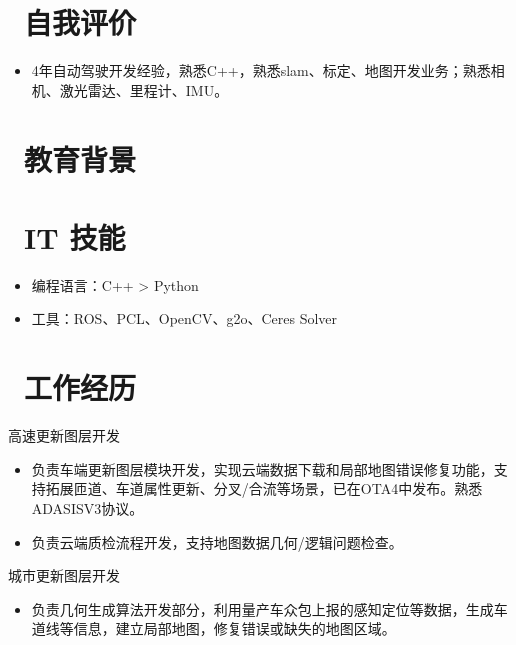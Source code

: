 \documentclass{resume}
\begin{document}




\section{\faBook\ 自我评价}
\begin{itemize}[parsep=0.5ex]
  \item 4年自动驾驶开发经验，熟悉C++，熟悉slam、标定、地图开发业务；熟悉相机、激光雷达、里程计、IMU。
\end{itemize}


\section{\faGraduationCap\  教育背景}

\section{\faCogs\ IT 技能}
\begin{itemize}[parsep=0.5ex]
  \item 编程语言：C++ > Python
  \item 工具：ROS、PCL、OpenCV、g2o、Ceres Solver
\end{itemize}

\section{\faUsers\ 工作经历}
\begin{onehalfspacing}
  高速更新图层开发
  \begin{itemize}
    \item {负责车端更新图层模块开发，实现云端数据下载和局部地图错误修复功能，支持拓展匝道、车道属性更新、分叉/合流等场景，已在OTA4中发布。熟悉ADASISV3协议。}
    \item 负责云端质检流程开发，支持地图数据几何/逻辑问题检查。
  \end{itemize}

  城市更新图层开发
  \begin{itemize}
    \item 负责几何生成算法开发部分，利用量产车众包上报的感知定位等数据，生成车道线等信息，建立局部地图，修复错误或缺失的地图区域。
  \end{itemize}
\end{onehalfspacing}
\end{document}
